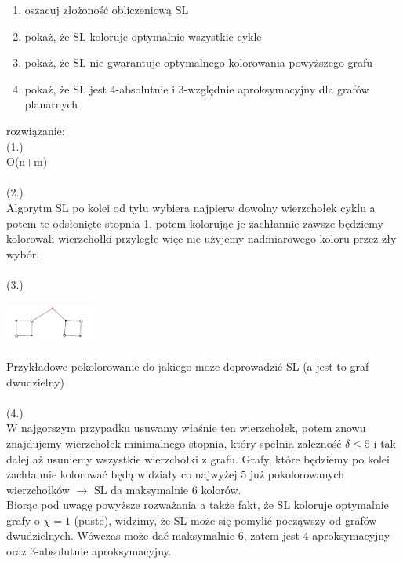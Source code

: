 \documentclass{article}
\begin{document}
\begin{enumerate}
	\item oszacuj złożoność obliczeniową SL
	\item pokaż, że SL koloruje optymalnie wszystkie cykle
	\item pokaż, że SL nie gwarantuje optymalnego kolorowania powyższego grafu
	\item pokaż, że SL jest 4-absolutnie i 3-względnie aproksymacyjny dla grafów planarnych
\end{enumerate}
rozwiązanie: \\
(1.) \\
O(n+m) \\\\
(2.) \\
Algorytm SL po kolei od tyłu wybiera najpierw dowolny wierzchołek cyklu a potem te odsłonięte stopnia 1, potem kolorując je zachłannie 
zawsze będziemy kolorowali wierzchołki przyległe więc nie użyjemy nadmiarowego koloru przez zły wybór. \\\\
(3.)\\
\begin{center}
\includegraphics[width=3cm]{niebieske_jajca}
\end{center}
Przykładowe pokolorowanie do jakiego może doprowadzić SL (a jest to graf dwudzielny) \\\\
(4.)\\
W najgorszym przypadku usuwamy właśnie ten wierzchołek, potem znowu znajdujemy wierzchołek minimalnego stopnia, który spełnia zależność 
$\delta \le 5$ 
i tak dalej aż usuniemy wszystkie wierzchołki z grafu.  Grafy, które będziemy po kolei zachłannie kolorować 
będą widziały co najwyżej 5 już pokolorowanych wierzchołków $\rightarrow$ SL da maksymalnie 6 kolorów. \\
Biorąc pod uwagę powyższe rozważania a także fakt, że SL koloruje optymalnie grafy o $\chi = 1$ (puste),  widzimy, że 
SL może się pomylić począwszy od grafów dwudzielnych. Wówczas może dać maksymalnie 6, zatem jest 4-aproksymacyjny oraz 3-absolutnie aproksymacyjny.
\end{document}
